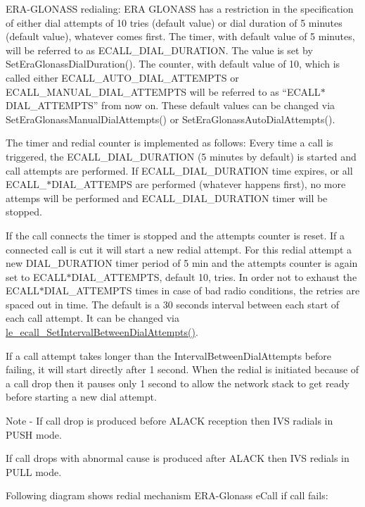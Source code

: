 E\+R\+A-\/\+G\+L\+O\+N\+A\+SS redialing\+: E\+RA G\+L\+O\+N\+A\+SS has a restriction in the specification of either dial attempts of 10 tries (default value) or dial duration of 5 minutes (default value), whatever comes first. The timer, with default value of 5 minutes, will be referred to as E\+C\+A\+L\+L\+\_\+\+D\+I\+A\+L\+\_\+\+D\+U\+R\+A\+T\+I\+ON. The value is set by Set\+Era\+Glonass\+Dial\+Duration(). The counter, with default value of 10, which is called either E\+C\+A\+L\+L\+\_\+\+A\+U\+T\+O\+\_\+\+D\+I\+A\+L\+\_\+\+A\+T\+T\+E\+M\+P\+TS or E\+C\+A\+L\+L\+\_\+\+M\+A\+N\+U\+A\+L\+\_\+\+D\+I\+A\+L\+\_\+\+A\+T\+T\+E\+M\+P\+TS will be referred to as “\+E\+C\+A\+L\+L$\ast$\+D\+I\+A\+L\+\_\+\+A\+T\+T\+E\+M\+P\+T\+S” from now on. These default values can be changed via Set\+Era\+Glonass\+Manual\+Dial\+Attempts() or Set\+Era\+Glonass\+Auto\+Dial\+Attempts().

The timer and redial counter is implemented as follows\+: Every time a call is triggered, the E\+C\+A\+L\+L\+\_\+\+D\+I\+A\+L\+\_\+\+D\+U\+R\+A\+T\+I\+ON (5 minutes by default) is started and call attempts are performed. If E\+C\+A\+L\+L\+\_\+\+D\+I\+A\+L\+\_\+\+D\+U\+R\+A\+T\+I\+ON time expires, or all E\+C\+A\+L\+L\+\_\+$\ast$\+D\+I\+A\+L\+\_\+\+A\+T\+T\+E\+M\+PS are performed (whatever happens first), no more attemps will be performed and E\+C\+A\+L\+L\+\_\+\+D\+I\+A\+L\+\_\+\+D\+U\+R\+A\+T\+I\+ON timer will be stopped.

If the call connects the timer is stopped and the attempts counter is reset. If a connected call is cut it will start a new redial attempt. For this redial attempt a new D\+I\+A\+L\+\_\+\+D\+U\+R\+A\+T\+I\+ON timer period of 5 min and the attempts counter is again set to E\+C\+A\+L\+L$\ast$\+D\+I\+A\+L\+\_\+\+A\+T\+T\+E\+M\+P\+TS, default 10, tries. In order not to exhaust the E\+C\+A\+L\+L$\ast$\+D\+I\+A\+L\+\_\+\+A\+T\+T\+E\+M\+P\+TS times in case of bad radio conditions, the retries are spaced out in time. The default is a 30 seconds interval between each start of each call attempt. It can be changed via \hyperlink{le__ecall__interface_8h_af90a8602d4b1d0cacaa3971c508dd188}{le\+\_\+ecall\+\_\+\+Set\+Interval\+Between\+Dial\+Attempts()}.

If a call attempt takes longer than the Interval\+Between\+Dial\+Attempts before failing, it will start directly after 1 second. When the redial is initiated because of a call drop then it pauses only 1 second to allow the network stack to get ready before starting a new dial attempt.

\begin{DoxyNote}{Note}
-\/ If call drop is produced before A\+L\+A\+CK reception then I\+VS radials in P\+U\+SH mode.
\begin{DoxyItemize}
\item If call drops with abnormal cause is produced after A\+L\+A\+CK then I\+VS redials in P\+U\+LL mode.
\end{DoxyItemize}
\end{DoxyNote}
Following diagram shows redial mechanism E\+R\+A-\/\+Glonass e\+Call if call fails\+:


